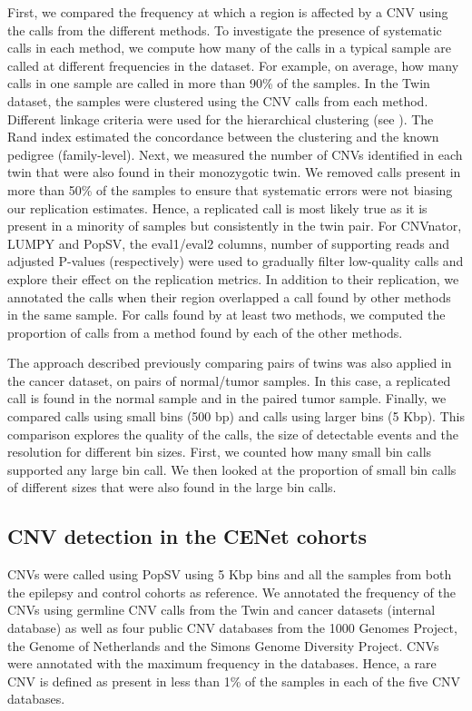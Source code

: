First, we compared the frequency at which a region is affected by a CNV using the calls from the different methods.
To investigate the presence of systematic calls in each method, we compute how many of the calls in a typical sample are called at different frequencies in the dataset.
For example, on average, how many calls in one sample are called in more than 90\% of the samples.
In the Twin dataset, the samples were clustered using the CNV calls from each method.
Different linkage criteria were used for the hierarchical clustering (see ).
The Rand index estimated the concordance between the clustering and the known pedigree (family-level).
Next, we measured the number of CNVs identified in each twin that were also found in their monozygotic twin.
We removed calls present in more than 50\% of the samples to ensure that systematic errors were not biasing our replication estimates.
Hence, a replicated call is most likely true as it is present in a minority of samples but consistently in the twin pair.
For {\sf CNVnator}, {\sf LUMPY} and {\sf PopSV}, the eval1/eval2 columns, number of supporting reads and adjusted P-values (respectively) were used to gradually filter low-quality calls and explore their effect on the replication metrics.
In addition to their replication, we annotated the calls when their region overlapped a call found by other methods in the same sample.
For calls found by at least two methods, we computed the proportion of calls from a method found by each of the other methods.

The approach described previously comparing pairs of twins was also applied in the cancer dataset, on pairs of normal/tumor samples.
In this case, a replicated call is found in the normal sample and in the paired tumor sample.
Finally, we compared calls using small bins (500 bp) and calls using larger bins (5 Kbp).
This comparison explores the quality of the calls, the size of detectable events and the resolution for different bin sizes.
First, we counted how many small bin calls supported any large bin call.
We then looked at the proportion of small bin calls of different sizes that were also found in the large bin calls.

\subsection*{CNV detection in the CENet cohorts}
CNVs were called using {\sf PopSV} using 5 Kbp bins and all the samples from both the epilepsy and control cohorts as reference.
We annotated the frequency of the CNVs using germline CNV calls from the Twin and cancer datasets (internal database) as well as four public CNV databases from the 1000 Genomes Project\cite{Sudmant2015a,Handsaker2015}, the Genome of Netherlands\cite{Francioli2014} and the Simons Genome Diversity Project\cite{Sudmant2015}.
CNVs were annotated with the maximum frequency in the databases.
Hence, a rare CNV is defined as present in less than 1\% of the samples in each of the five CNV databases.


